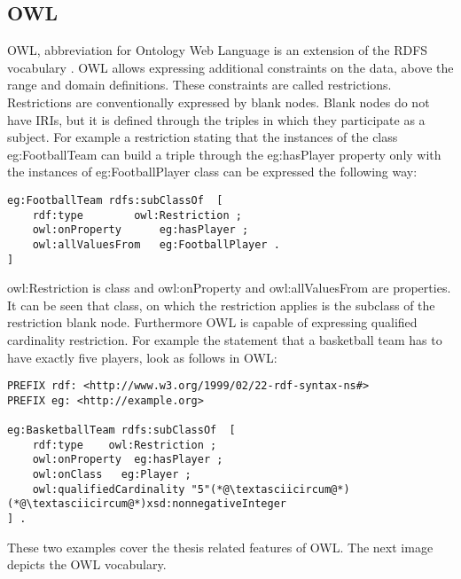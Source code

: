 

\subsection{OWL}

OWL, abbreviation for Ontology Web Language is an extension of the RDFS vocabulary \cite{Dean:04:OWO}. OWL allows expressing additional constraints on the data, above the range and domain definitions. These constraints are called restrictions. Restrictions are conventionally expressed by blank nodes. Blank nodes do not have IRIs, but it is defined through the triples in which they participate as a subject. For example a restriction stating that the instances of the class eg:FootballTeam can build a triple through the eg:hasPlayer property only with the instances of eg:FootballPlayer class can be expressed the following way:

\begin{lstlisting}[basicstyle=\footnotesize, captionpos=b, caption=OWL restriction in N3 format, label=lst:sparql, belowskip=1em, aboveskip=2em,
frame=single]
eg:FootballTeam rdfs:subClassOf  [ 
	rdf:type		owl:Restriction ; 
	owl:onProperty		eg:hasPlayer ; 
	owl:allValuesFrom	eg:FootballPlayer .
]
\end{lstlisting}

owl:Restriction is class and owl:onProperty and owl:allValuesFrom are properties. It can be seen that class, on which the restriction applies is the subclass of the restriction blank node.
Furthermore OWL is capable of expressing qualified cardinality restriction. For example the statement that a basketball team has to have exactly five players, look as follows in OWL:


\begin{lstlisting}[captionpos=b, caption=OWL restriction in N3 format, label=lst:sparql, belowskip=1em, aboveskip=2em,
basicstyle=\footnotesize,frame=single]
PREFIX rdf: <http://www.w3.org/1999/02/22-rdf-syntax-ns#>
PREFIX eg: <http://example.org> 

eg:BasketballTeam rdfs:subClassOf  [
	rdf:type	owl:Restriction ; 
	owl:onProperty	eg:hasPlayer ; 
	owl:onClass	  eg:Player ; 
	owl:qualifiedCardinality "5"(*@\textasciicircum@*)(*@\textasciicircum@*)xsd:nonnegativeInteger
] . 

\end{lstlisting}


These two examples cover the thesis related features of OWL. The next image depicts the OWL vocabulary. 

